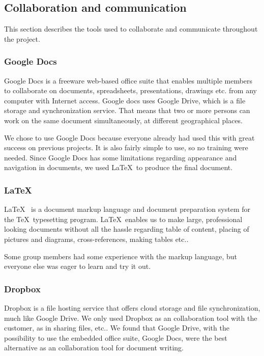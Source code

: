 \documentclass[11pt]{book}
\begin{document}
\subsection{Collaboration and communication}
This section describes the tools used to collaborate and communicate throughout the project.

\subsubsection{Google Docs}
Google Docs\cite{googleDocs} is a freeware web-based office suite that enables multiple members to collaborate on documents, spreadsheets, presentations, drawings etc. from any computer with Internet access. Google docs uses Google Drive, which is a file storage and synchronization service. That means that two or more persons can work on the same document simultaneously, at different geographical places. 

We chose to use Google Docs because everyone already had used this with great success on previous projects. It is also fairly simple to use, so no training were needed. Since Google Docs has some limitations regarding appearance and navigation in documents, we used \LaTeX~to produce the final document.

\subsubsection{\LaTeX}
\LaTeX~\cite{latex} is a document markup language and document preparation system for the \TeX~typesetting program. \LaTeX~enables us to make large, professional looking documents without all the hassle regarding table of content, placing of pictures and diagrams, cross-references, making tables etc.. 

Some group members had some experience with the markup language, but everyone else was eager to learn and try it out.

\subsubsection{Dropbox}
Dropbox\cite{dropbox} is a file hosting service that offers cloud storage and file synchronization, much like Google Drive. We only used Dropbox as an collaboration tool with the customer, as in sharing files, etc.. We found that Google Drive, with the possibility to use the embedded office suite, Google Docs, were the best alternative as an collaboration tool for document writing.
\end{document}

